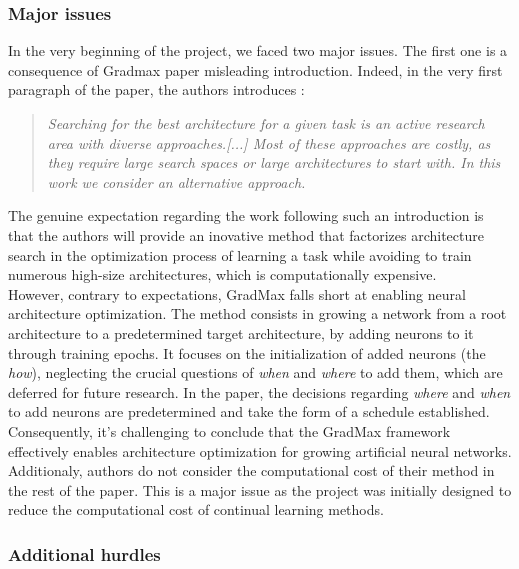 \documentclass{article}
\begin{document}
\subsubsection{Major issues}

In the very beginning of the project, we faced two major issues. The first one is a consequence of Gradmax paper misleading introduction. Indeed, in the very first paragraph of the paper, the authors introduces :
\begin{quote}
    \itshape
    Searching for the best architecture for a given task is an active research area with diverse approaches.[...] Most of these approaches are costly, as they require large search spaces or large architectures to start with. In this work we consider an alternative approach.
\end{quote}

\noindent
The genuine expectation regarding the work following such an introduction is that the authors will provide an inovative method that factorizes architecture search in the optimization process of learning a task while avoiding to train numerous high-size architectures, which is computationally expensive.\\

\noindent
However, contrary to expectations, GradMax falls short at enabling neural architecture optimization. The method consists in growing a network from a root architecture to a predetermined target architecture, by adding neurons to it through training epochs. It focuses on the initialization of added neurons (the \textit{how}), neglecting the crucial questions of \textit{when} and \textit{where} to add them, which are deferred for future research. In the paper, the decisions regarding \textit{where} and \textit{when} to add neurons are predetermined and take the form of a schedule established. Consequently, it's challenging to conclude that the GradMax framework effectively enables architecture optimization for growing artificial neural networks.\\

\noindent
Additionaly, authors do not consider the computational cost of their method in the rest of the paper. This is a major issue as the project was initially designed to reduce the computational cost of continual learning methods.

\subsubsection{Additional hurdles}
\end{document}
